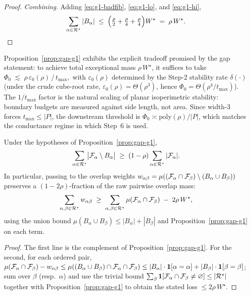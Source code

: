 \begin{proof}
\medskip\noindent\emph{Combining.}
Adding \eqref{eq:g1-badfib}, \eqref{eq:g1-lo}, and \eqref{eq:g1-hi},
\[
\sum_{\alpha\in\mathcal{R}^\star}|B_\alpha|
 \;\le\;\Bigl(\tfrac{\rho}{2}+\tfrac{\rho}{4}+\tfrac{\rho}{4}\Bigr)W^\star
 \;=\;\rho\,W^\star.
\qedhere
\]
\end{proof}

\begin{remark}
\label{rem:g1-tradeoff}
Proposition~\ref{prop:gap-g1} exhibits the explicit tradeoff promised
by the gap statement: to achieve total exceptional mass
$\rho\,W^\star$, it suffices to take
\(
\Phi_0 \;\lesssim\; \rho\,\varepsilon_0(\rho)\,/\,t_{\max},
\)
with $\varepsilon_0(\rho)$ determined by the Step-2 stability rate
$\delta(\cdot)$ (under the crude cube-root rate,
$\varepsilon_0(\rho)=\Theta(\rho^3)$, hence
$\Phi_0=\Theta(\rho^4/t_{\max})$).  The $1/t_{\max}$ factor is the
natural scaling of planar isoperimetric stability: boundary budgets are
measured against side length, not area.  Since width-$3$ forces
$t_{\max}\le|P|$, the downstream threshold is $\Phi_0\asymp
\mathrm{poly}(\rho)/|P|$, which matches the conductance regime in
which Step~6 is used.
\end{remark}

\begin{corollary}\label{cor:g1-fraction}
Under the hypotheses of Proposition~\ref{prop:gap-g1},
\[
\sum_{\alpha\in\mathcal{R}^\star}\bigl|\mathcal{F}_{\alpha}\setminus
B_\alpha\bigr|
 \;\ge\;(1-\rho)\sum_{\alpha\in\mathcal{R}^\star}|\mathcal{F}_{\alpha}|.
\]
In particular, passing to the overlap weights
$w_{\alpha\beta}=\mu((\mathcal{F}_{\alpha}\cap\mathcal{F}_{\beta})\setminus
(B_\alpha\cup B_\beta))$ preserves a $(1-2\rho)$-fraction of the raw
pairwise overlap mass:
\[
\sum_{\alpha,\beta\in\mathcal{R}^\star}w_{\alpha\beta}
 \;\ge\;
 \sum_{\alpha,\beta\in\mathcal{R}^\star}
   \mu(\mathcal{F}_{\alpha}\cap\mathcal{F}_{\beta})\;-\;2\rho\,W^\star,
\]
using the union bound
$\mu(B_\alpha\cup B_\beta)\le|B_\alpha|+|B_\beta|$ and
Proposition~\ref{prop:gap-g1} on each term.
\end{corollary}

\begin{proof}
The first line is the complement of Proposition~\ref{prop:gap-g1}.  For
the second, for each ordered pair,
$\mu(\mathcal{F}_{\alpha}\cap\mathcal{F}_{\beta})-w_{\alpha\beta}\le
\mu((B_\alpha\cup B_\beta)\cap\mathcal{F}_{\alpha}\cap\mathcal{F}_{\beta})\le
|B_\alpha|\cdot\mathbf{1}[\alpha=\alpha]+|B_\beta|\cdot\mathbf{1}[\beta=\beta]$;
sum over $\beta$ (resp.\ $\alpha$) and use the trivial bound
$\sum_\beta\mathbf{1}[\mathcal{F}_{\alpha}\cap\mathcal{F}_{\beta}\ne\varnothing]\le
|\mathcal{R}^\star|$ together with Proposition~\ref{prop:gap-g1} to obtain
the stated loss $\le 2\rho\,W^\star$.
\end{proof}

